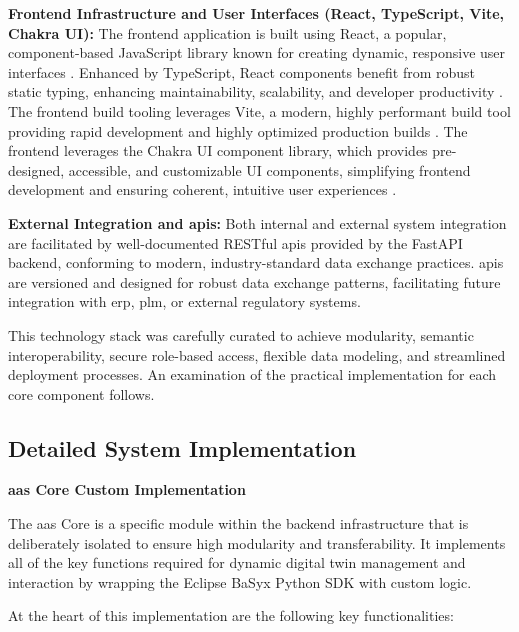 \textbf{Frontend Infrastructure and User Interfaces (React, TypeScript, Vite, Chakra UI):}
The frontend application is built using React, a popular, component-based JavaScript library known for creating dynamic, responsive user interfaces \autocite{MetaPlatformsInc..n.d.}. Enhanced by TypeScript, React components benefit from robust static typing, enhancing maintainability, scalability, and developer productivity \autocite{Microsoft.n.d.}. The frontend build tooling leverages Vite, a modern, highly performant build tool providing rapid development and highly optimized production builds \autocite{VoidZeroInc.n.d.}. The frontend leverages the Chakra UI component library, which provides pre-designed, accessible, and customizable UI components, simplifying frontend development and ensuring coherent, intuitive user experiences \autocite{ChakraSystems.n.d.}.

\textbf{External Integration and \ac{api}s:}
Both internal and external system integration are facilitated by well-documented RESTful \ac{api}s provided by the FastAPI backend, conforming to modern, industry-standard data exchange practices. \ac{api}s are versioned and designed for robust data exchange patterns, facilitating future integration with \ac{erp}, \ac{plm}, or external regulatory systems.

This technology stack was carefully curated to achieve modularity, semantic interoperability, secure role-based access, flexible data modeling, and streamlined deployment processes. An examination of the practical implementation for each core component follows.

\subsection{Detailed System Implementation}

\textbf{\ac{aas} Core Custom Implementation}

The \ac{aas} Core is a specific module within the backend infrastructure that is deliberately isolated to ensure high modularity and transferability. It implements all of the key functions required for dynamic digital twin management and interaction by wrapping the Eclipse BaSyx Python SDK with custom logic.

At the heart of this implementation are the following key functionalities:

